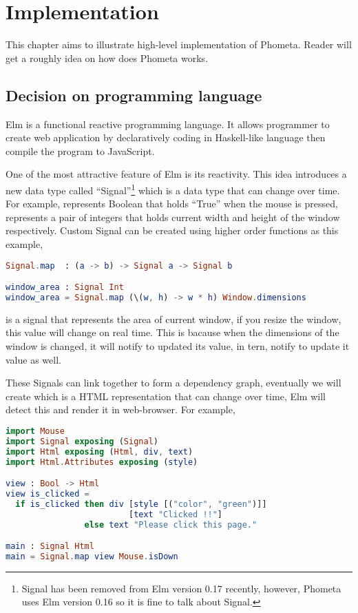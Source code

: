 \documentclass[master.tex]{subfiles}
\begin{document}
\chapter{Implementation}

This chapter aims to illustrate high-level implementation of Phometa. Reader
will get a roughly idea on how does Phometa works.

\section{Decision on programming language}
Elm\supercite{elm-official-website} is a functional reactive programming
language. It allows programmer to create web application by declaratively coding
in Haskell-like language then compile the program to JavaScript.

One of the most attractive feature of Elm is its reactivity. This idea
introduces a new data type called ``Signal''\footnote{Signal has been removed
  from Elm version 0.17 recently, however, Phometa uses Elm version 0.16 so it
  is fine to talk about Signal.} which is a data type that can change over time.
For example,  represents Boolean that holds
``True'' when the mouse is pressed,  represents a pair of integers that holds current width and height of the
window respectively. Custom Signal can be created using higher order functions
as this example,
\begin{lstlisting}[language=elm]
Signal.map  : (a -> b) -> Signal a -> Signal b

window_area : Signal Int
window_area = Signal.map (\(w, h) -> w * h) Window.dimensions
\end{lstlisting}
 is a signal that represents the area of current window, if
you resize the window, this value will change on real time. This is bacause when
the dimensions of the window is changed, it will notify
 to updated its value,  in
tern, notify  to update it value as well.

These Signals can link together to form a dependency graph, eventually we will
create  which is a HTML representation that can change
over time, Elm will detect this  and render it in web-browser. For
example,

\begin{lstlisting}[language=elm]
import Mouse
import Signal exposing (Signal)
import Html exposing (Html, div, text)
import Html.Attributes exposing (style)

view : Bool -> Html
view is_clicked =
  if is_clicked then div [style [("color", "green")]]
                         [text "Clicked !!"]
                else text "Please click this page."

main : Signal Html
main = Signal.map view Mouse.isDown
\end{lstlisting}
\end{document}
